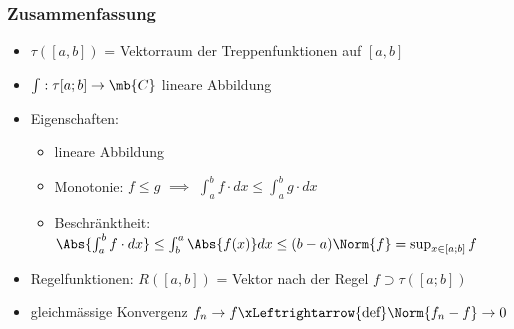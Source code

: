 \subsubsection{Zusammenfassung}
\begin{itemize}
  \item $\tau\left( [a,b] \right)$ = Vektorraum der Treppenfunktionen auf $[a,b]$
  \item $\int: \tau[a;b]\to\mb{C}$ lineare Abbildung
  \item Eigenschaften:
    \begin{itemize}
      \item lineare Abbildung
      \item Monotonie: $f\leq g$ $\implies$ $\int^b_af\cdot dx\leq \int^b_ag\cdot dx$
      \item Beschränktheit: $\Abs{\int^b_af\cdot dx}\leq \int^a_b\Abs{f(x)}dx\leq (b-a)\Norm{f} = \sup_{x\in[a;b]}f$
    \end{itemize}
  \item Regelfunktionen: $R\left( [a,b] \right)$ = Vektor nach der Regel $f\supset\tau\left( [a;b] \right)$
  \item gleichmässige Konvergenz $f_n\to f\xLeftrightarrow{\text{def}}\Norm{f_n-f}\to 0$
\end{itemize}
